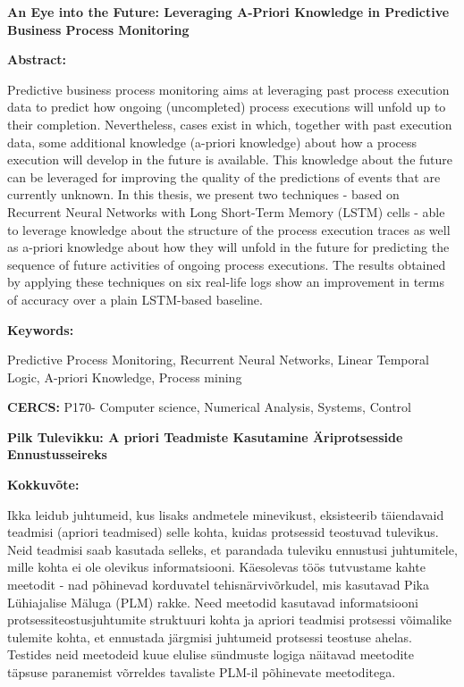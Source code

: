
\noindent
{\large \textbf{An Eye into the Future: Leveraging A-Priori Knowledge in Predictive Business Process Monitoring}}

\vspace{4mm}
\noindent
\textbf{Abstract:}
\par
\noindent
Predictive business process monitoring aims at leveraging past process execution data to predict how ongoing (uncompleted) process executions will unfold up to their completion. Nevertheless, cases exist in which, together with past
execution data, some additional knowledge (a-priori
knowledge) about how a process execution will develop in the future is available. This knowledge about the future can be leveraged for
improving the quality of the predictions of events that are currently unknown. In this thesis, we present two
techniques - based on Recurrent Neural Networks with Long Short-Term Memory (LSTM) cells - able to
leverage knowledge about the structure of the process execution traces as well as a-priori knowledge about how they will unfold in the future for predicting the sequence of future activities of ongoing process executions. The results obtained by applying these techniques on six real-life logs show an improvement in terms of accuracy over a plain
LSTM-based baseline.

\par
\vspace{4mm}
\noindent
\textbf{Keywords:} 
\par 
\noindent
Predictive Process Monitoring, Recurrent Neural Networks, Linear Temporal Logic, A-priori Knowledge, Process mining


\par
\vspace{4mm}
\noindent
\textbf{CERCS:} P170- Computer science, Numerical Analysis, Systems, Control


\vspace{4mm}
\noindent
{\large \textbf{Pilk Tulevikku: A priori Teadmiste Kasutamine Äriprotsesside Ennustusseireks}}

\vspace{4mm}
\noindent
\textbf{Kokkuvõte:}
\par
\noindent
Ikka leidub juhtumeid, kus lisaks andmetele minevikust, eksisteerib täiendavaid teadmisi (apriori teadmised) selle kohta, kuidas protsessid teostuvad tulevikus. Neid teadmisi saab kasutada selleks, et parandada tuleviku ennustusi juhtumitele, mille kohta ei ole olevikus informatsiooni. Käesolevas töös tutvustame kahte meetodit - nad põhinevad korduvatel tehisnärvivõrkudel, mis kasutavad Pika Lühiajalise Mäluga (PLM) rakke. Need meetodid kasutavad informatsiooni protsessiteostusjuhtumite struktuuri kohta ja apriori teadmisi protsessi võimalike tulemite kohta, et ennustada järgmisi juhtumeid protsessi teostuse ahelas. Testides neid meetodeid kuue elulise sündmuste logiga näitavad meetodite täpsuse paranemist võrreldes tavaliste PLM-il põhinevate meetoditega.

